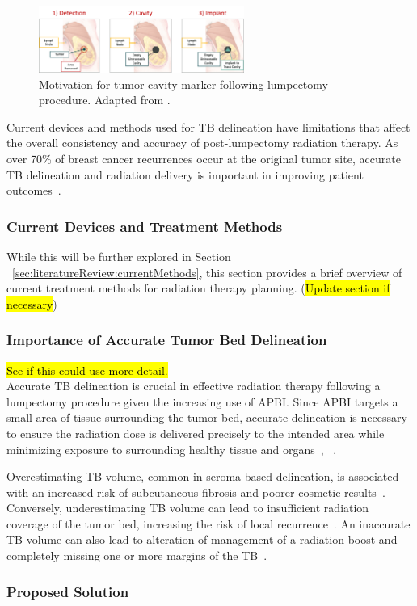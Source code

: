 \begin{figure}[h!]
        \centering
        \includegraphics[width=0.6\textwidth]{../figs/introduction/need_for_tumor_bed_marker.png}
        \caption{Motivation for tumor cavity marker following lumpectomy procedure. Adapted from \cite{RefWorks:RefID:38-johnbreastconserving}.}
        \label{fig:introduction:need_for_tumor_bed_marker}
\end{figure}

Current devices and methods used for TB delineation have limitations that affect the overall consistency and accuracy of post-lumpectomy radiation therapy. As over 70\% of breast cancer recurrences occur at the original tumor site, accurate TB delineation and radiation delivery is important in improving patient outcomes~\cite{RefWorks:RefID:25-acree2022review}.

\subsubsection{Current Devices and Treatment Methods}
While this will be further explored in Section ~\ref{sec:literatureReview:currentMethods}, this section provides a brief overview of current treatment methods for radiation therapy planning. (\hl{Update section if necessary})

\subsubsection{Importance of Accurate Tumor Bed Delineation\label{sec:introduction:motivation:importanceofaccuratetumorbeddelineation}}
\hl{See if this could use more detail.\\}
Accurate TB delineation is crucial in effective radiation therapy following a lumpectomy procedure given the increasing use of APBI. Since APBI targets a small area of tissue surrounding the tumor bed, accurate delineation is necessary to ensure the radiation dose is delivered precisely to the intended area while minimizing exposure to surrounding healthy tissue and organs~\cite{RefWorks:RefID:197-den2015postlumpectomy}, ~\cite{RefWorks:RefID:25-acree2022review}.

Overestimating TB volume, common in seroma-based delineation, is associated with an increased risk of subcutaneous fibrosis and poorer cosmetic results~\cite{RefWorks:RefID:197-den2015postlumpectomy}. Conversely, underestimating TB volume can lead to insufficient radiation coverage of the tumor bed, increasing the risk of local recurrence~\cite{RefWorks:RefID:198-jiao2024interobserver}. An inaccurate TB volume can
also lead to alteration of management of a radiation boost and completely missing one or more margins of the TB~\cite{RefWorks:RefID:344-mitchell2019adaptable}.

\subsubsection{Proposed Solution\label{sec:introduction:motivation:proposedsolution}}
